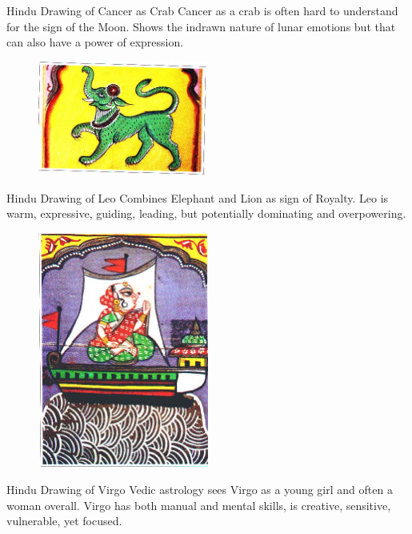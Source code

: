  

Hindu Drawing of Cancer as Crab
Cancer as a crab is often hard to understand for the sign of the Moon.
Shows the indrawn nature of lunar emotions but that can also have a power of expression.



 \begin{figure}[H]
 \centering
\includegraphics[width=0.5\textwidth]{pics/Leo.png}
 \end{figure}

Hindu Drawing of Leo
Combines Elephant and Lion as sign of Royalty.
Leo is warm, expressive, guiding, leading, but potentially dominating and overpowering.

 
\begin{figure}[H]
 \centering
\includegraphics[width=0.5\textwidth]{pics/Virgo.png}
 \end{figure}


 

Hindu Drawing of Virgo
Vedic astrology sees Virgo as a young girl and often a woman overall.
Virgo has both manual and mental skills, is creative, sensitive, vulnerable, yet focused.

